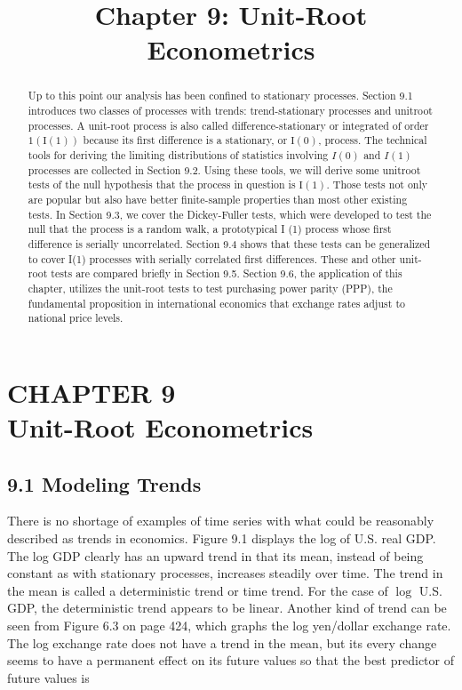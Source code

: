 \documentclass[10pt]{article}
\title{Chapter 9: Unit-Root Econometrics}
\author{}
\date{}
\begin{document}
\maketitle

\section*{CHAPTER 9 \\
 Unit-Root Econometrics }
\begin{abstract}
Up to this point our analysis has been confined to stationary processes. Section 9.1 introduces two classes of processes with trends: trend-stationary processes and unitroot processes. A unit-root process is also called difference-stationary or integrated of order $1(\mathrm{I}(1))$ because its first difference is a stationary, or $\mathrm{I}(0)$, process. The technical tools for deriving the limiting distributions of statistics involving $I(0)$ and $I(1)$ processes are collected in Section 9.2. Using these tools, we will derive some unitroot tests of the null hypothesis that the process in question is $\mathrm{I}(1)$. Those tests not only are popular but also have better finite-sample properties than most other existing tests. In Section 9.3, we cover the Dickey-Fuller tests, which were developed to test the null that the process is a random walk, a prototypical I (1) process whose first difference is serially uncorrelated. Section 9.4 shows that these tests can be generalized to cover I(1) processes with serially correlated first differences. These and other unit-root tests are compared briefly in Section 9.5. Section 9.6, the application of this chapter, utilizes the unit-root tests to test purchasing power parity (PPP), the fundamental proposition in international economics that exchange rates adjust to national price levels.
\end{abstract}

\subsection*{9.1 Modeling Trends}
There is no shortage of examples of time series with what could be reasonably described as trends in economics. Figure 9.1 displays the log of U.S. real GDP. The log GDP clearly has an upward trend in that its mean, instead of being constant as with stationary processes, increases steadily over time. The trend in the mean is called a deterministic trend or time trend. For the case of $\log$ U.S. GDP, the deterministic trend appears to be linear. Another kind of trend can be seen from Figure 6.3 on page 424, which graphs the log yen/dollar exchange rate. The log exchange rate does not have a trend in the mean, but its every change seems to have a permanent effect on its future values so that the best predictor of future values is
\end{document}
